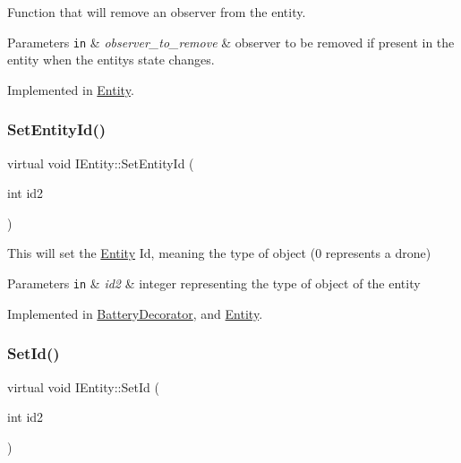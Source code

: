 Function that will remove an observer from the entity. 


\begin{DoxyParams}[1]{Parameters}
\mbox{\tt in}  & {\em observer\+\_\+to\+\_\+remove} & observer to be removed if present in the entity when the entity\textquotesingle{}s state changes. \\
\hline
\end{DoxyParams}


Implemented in \hyperlink{classEntity_a8e6bb1a529eaa32782d83824861ff29f}{Entity}.

\mbox{\label{classIEntity_a3a830862181cb0548d2aca83d908263e}} 
\subsubsection{\texorpdfstring{Set\+Entity\+Id()}{SetEntityId()}}
{\footnotesize\ttfamily virtual void I\+Entity\+::\+Set\+Entity\+Id (\begin{DoxyParamCaption}\item[{int}]{id2 }\end{DoxyParamCaption})\hspace{0.3cm}{\ttfamily [pure virtual]}}



This will set the \hyperlink{classEntity}{Entity} Id, meaning the type of object (0 represents a drone) 


\begin{DoxyParams}[1]{Parameters}
\mbox{\tt in}  & {\em id2} & integer representing the type of object of the entity \\
\hline
\end{DoxyParams}


Implemented in \hyperlink{classBatteryDecorator_a59bc5191357fdeb9a52ee6121d79b12d}{Battery\+Decorator}, and \hyperlink{classEntity_a2cc57041bbb23a4acdf1b2afe1756ac7}{Entity}.

\mbox{\label{classIEntity_a8c6af682e07f569ba2f164d214295c67}} 
\subsubsection{\texorpdfstring{Set\+Id()}{SetId()}}
{\footnotesize\ttfamily virtual void I\+Entity\+::\+Set\+Id (\begin{DoxyParamCaption}\item[{int}]{id2 }\end{DoxyParamCaption})\hspace{0.3cm}{\ttfamily [pure virtual]}}



